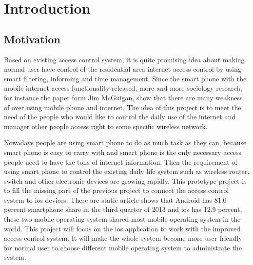 \chapter{Introduction}
\label{chp:intro}

\section{Motivation}
\par Based on existing access control system, it is quite promising idea about making normal user have control of the residential area internet access control by using smart filtering, informing and time management. Since the smart phone with the mobile internet access functionality released, more and more sociology research, for instance the paper form Jim McGuigan\cite{MobilePhoneSociology}, show that there are many weakness of over using mobile phone and internet. The idea of this project is to  meet the need of the people who would like to control the daily use of the internet and manager other people access right to some specific wireless network.
\par Nowadays people are using smart phone to do as much task as they can, because smart phone is easy to carry with and smart phone is the only necessary access people need to have the tons of internet information. Then the requirement of using smart phone to control the existing daily life system such as wireless router, switch and other electronic devices are growing rapidly. This prototype project is to fill the missing part of the previous project to connect the access control system to \gls{ios} devices. There are static article\cite{MobileOSMarketShare} shows that Android has 81.0 percent smartphone share in the third quarter of 2013  and \gls{ios} has 12.9 percent, these two mobile operating system shared most mobile operating system in the world. This project will focus on the \gls{ios} application to work with the improved access control system. It will make the whole system become more user friendly for normal user to choose different mobile operating system to administrate the system.

